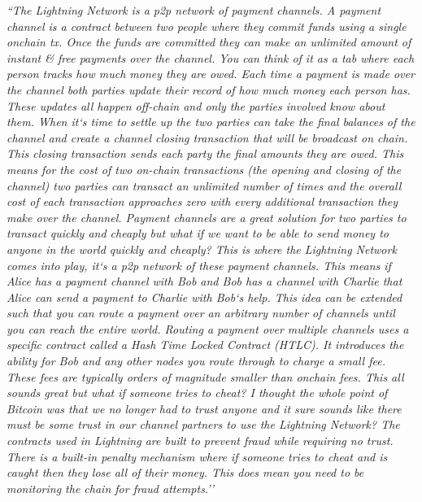 \textit{``The Lightning Network is a p2p network of payment channels. A payment channel is a contract between two people where they commit funds using a single onchain tx.  Once the funds are committed they can make an unlimited amount of instant \& free payments over the channel.
You can think of it as a tab where each person tracks how much money they are owed.  Each time a payment is made over the channel both parties update their record of how much money each person has.  These updates all happen off-chain and only the parties involved know about them. When it`s time to settle up the two parties can take the final balances of the channel and create a channel closing transaction that will be broadcast on chain.  This closing transaction sends each party the final amounts they are owed. This means for the cost of two on-chain transactions (the opening and closing of the channel) two parties can transact an unlimited number of times and the overall cost of each transaction approaches zero with every additional transaction they make over the channel. Payment channels are a great solution for two parties to transact quickly and cheaply but what if we want to be able to send money to anyone in the world quickly and cheaply?  This is where the Lightning Network comes into play, it`s a p2p network of these payment channels. This means if Alice has a payment channel with Bob and Bob has a channel with Charlie that Alice can send a payment to Charlie with Bob`s help. This idea can be extended such that you can route a payment over an arbitrary number of channels until you can reach the entire world. Routing a payment over multiple channels uses a specific contract called a Hash Time Locked Contract (HTLC).  It introduces the ability for Bob and any other nodes you route through to charge a small fee.  These fees are typically orders of magnitude smaller than onchain fees. This all sounds great but what if someone tries to cheat? I thought the whole point of Bitcoin was that we no longer had to trust anyone and it sure sounds like there must be some trust in our channel partners to use the Lightning Network? The contracts used in Lightning are built to prevent fraud while requiring no trust.  There is a built-in penalty mechanism where if someone tries to cheat and is caught then they lose all of their money.  This does mean you need to be monitoring the chain for fraud attempts.''}

